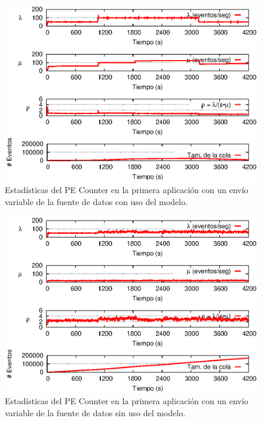 \begin{figure}[!ht]
\centering
    \includegraphics[scale=1.1]{images/exp/app1/normal/cm/statusCounterPE.eps}
    \caption{Estad\'isticas del PE Counter en la primera aplicaci\'on con un env\'io variable de la fuente de datos con uso del modelo.}
    \label{fig:app1-normal-statusCounterPE-cm}
\end{figure}

\begin{figure}[!ht]
\centering
    \includegraphics[scale=1.1]{images/exp/app1/normal/sm/statusCounterPE.eps}
    \caption{Estad\'isticas del PE Counter en la primera aplicaci\'on con un env\'io variable de la fuente de datos sin uso del modelo.}
    \label{fig:app1-normal-statusCounterPE-sm}
\end{figure}

